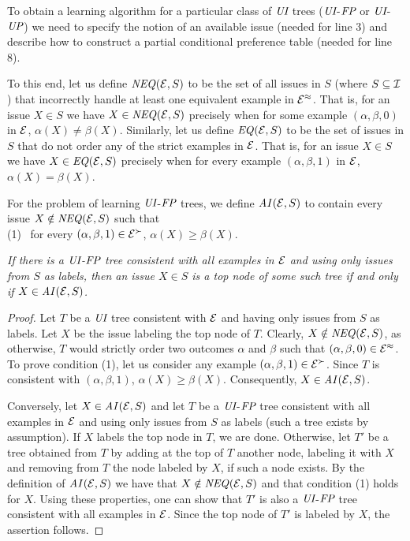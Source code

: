 To obtain a learning algorithm for a particular class of $\textit{UI}$ trees
($\textit{UI}$-$\textit{FP}$ or $\textit{UI}$-$\textit{UP}$) we need to specify the notion 
of an available issue (needed for line 3) and describe how to construct 
a partial conditional preference table (needed for line 8). 

To this end, let us define $\mathit{NEQ}(\mathcal{E},S)$ to be the set of all issues in
$S$ (where $S\subseteq \mathcal{I}$) that incorrectly handle at least one equivalent example 
in $\mathcal{E}^\approx$. That is, for an issue $X\in S$ we have $X\in \mathit{NEQ}(\mathcal{E},S)$
precisely when for some example $(\alpha,\beta,0)$ in $\mathcal{E}$, $\alpha(X)\not=
\beta(X)$. Similarly, let us define $\mathit{EQ}(\mathcal{E},S)$ to be the set of 
issues in $S$ that do not order any of the strict examples in $\mathcal{E}$. That 
is, for an issue $X\in S$ we have $X\in \mathit{EQ}(\mathcal{E},S)$ precisely when 
for every example $(\alpha,\beta,1)$ in $\mathcal{E}$, $\alpha(X)= \beta(X)$.  

For the problem of learning $\textit{UI}$-$\textit{FP}$ trees, we define $\mathit{AI}(\mathcal{E},S)$ to
contain every issue $X\notin \mathit{NEQ}(\mathcal{E},S)$ such that\\ 
(1) \ for every $(\alpha,\beta,1) \in \mathcal{E}^\succ$, $\alpha(X) 
\geq \beta(X)$.

\begin{prop}
\label{prop:1}
{\it If there is a $\textit{UI}$-$\textit{FP}$ tree consistent with all examples in $\mathcal{E}$ and 
using only issues from $S$ as labels, then an issue $X\in S$ is a top node
of some such tree if and only if $X\in \mathit{AI}(\mathcal{E},S)$.}
\end{prop}
\begin{proof}
Let $T$ be a $\textit{UI}$ tree consistent with $\mathcal{E}$ and having only issues from 
$S$ as labels. Let $X$ be the issue labeling the top node of $T$. Clearly,
$X\notin \mathit{NEQ}(\mathcal{E},S)$, as otherwise, $T$ would strictly order two outcomes
$\alpha$ and $\beta$ such that $(\alpha,\beta,0)\in \mathcal{E}^\approx$. To prove
condition (1), let us consider any example $(\alpha,\beta,1)\in \mathcal{E}^\succ$. 
Since $T$ is consistent with $(\alpha,\beta,1)$, $\alpha(X)\geq\beta(X)$. 
Consequently, $X\in \mathit{AI}(\mathcal{E},S)$.

Conversely, let $X\in \mathit{AI}(\mathcal{E},S)$ and let $T$ be a $\textit{UI}$-$\textit{FP}$ tree 
consistent with all examples in $\mathcal{E}$ and using only issues from $S$ as 
labels (such a tree exists by assumption). If $X$ labels the top node in 
$T$, we are done. Otherwise, let $T'$ be a tree obtained from $T$ by 
adding at the top of $T$ another node, labeling it with $X$ and removing
from $T$ the node labeled by $X$, if such a node exists. By the definition
of $\mathit{AI}(\mathcal{E},S)$ we have that $X\notin\mathit{NEQ}(\mathcal{E},S)$ and that condition (1) 
holds for $X$. Using these properties, one can show that $T'$ is also 
a $\textit{UI}$-$\textit{FP}$ 
tree consistent with all examples in $\mathcal{E}$. Since the top node of $T'$
is labeled by $X$, the assertion follows. 
\end{proof}

